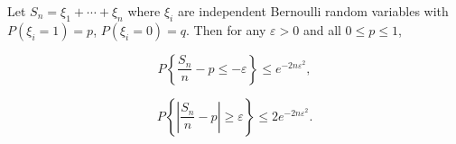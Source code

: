 Let $S_n = \xi_1 + \cdots + \xi_n$ where $\xi_i$ are independent Bernoulli random variables with $P(\xi_i = 1) = p$, $P(\xi_i = 0) = q$. Then for any $\varepsilon > 0$ and all $0 \leq p \leq 1$,

$$P\left\{ \frac{S_n}{n} - p \leq -\varepsilon \right\} \leq e^{-2n\varepsilon^2},$$

$$P\left\{ \left| \frac{S_n}{n} - p \right| \geq \varepsilon \right\} \leq 2e^{-2n\varepsilon^2}.$$
